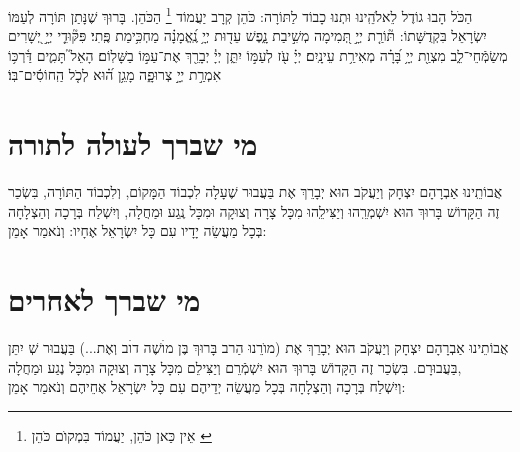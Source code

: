 \documentclass[a4paper, twoside, openany, parskip=half, 12pt]{article}
\begin{document}
 הַכֹּל הָבוּ גוֹדֶל לֵאלֹהֵֽינוּ וּתְנוּ כָבוֹד לַתּוֹרָה: כֹּהֵן קְרָב יַעֲמוֹד 
  \footnote{
  אֵין כַּאן כֹּהֵן, יַעֲמוֹד 
  בִּמְקוׂם כֹּהֵן
  \label{xx}} 
 הַכֹּהֵן. בָּרוּךְ שֶׁנָּתַן תּוֹרָה לְעַמּוֹ יִשְׂרָאֵל בִּקְדֻשָּׁתוֹ:
תּ֘וֹרַ֤ת יְיָ֣ תְּ֭מִימָה מְשִׁ֣יבַת נָ֑פֶשׁ עֵד֖וּת יְיָ֥ נֶֽ֝אֱמָנָ֗ה מַחְכִּ֥ימַת פֶּֽתִי׃ פִּקּ֘וּדֵ֤י יְיָ֣ יְ֭שָׁרִים מְשַׂמְּֿחֵי־לֵ֑ב מִצְוַ֖ת יְיָ֥ בָּ֝רָ֗ה מְאִירַ֥ת עֵינָֽיִם׃
 יְיָ֗ עֹ֖ז לְעַמּ֣וֹ יִתֵּ֑ן יְיָ֓ יְבָרֵ֖ךְ אֶת־עַמּ֣וֹ בַשָּׁלֽוֹם׃  הָאֵל֮ תָּמִ֢ים דַּ֫רְכּ֥וֹ אִמְרַ֣ת יְיָ֣ צְרוּפָ֑ה מָגֵ֥ן ה֝֗וּא לְכֹ֤ל הַֽחוֹסִ֬ים־בּֽוֹ׃

\section*{מי שברך לעולה לתורה}
 אֲבוֹתֵֽינוּ אַבְרָהָם יִצְחָק וְיַעֲקֹב הוּא יְבָרֵךְ אֶת 
  בַּעֲבוּר שֶׁעָלָה לִכְבוֹד הַמָּקוֹם,  וְלִכְבוֹד הַתּוֹרָה, 
 בִּשְׂכַר זֶה הַקָּדוֹשׁ בָּרוּךְ הוּא יִשְׁמְרֵֽהוּ וְיַצִּילֵֽהוּ מִכָּל צָרָה וְצוּקָה
וּמִכָּל נֶֽגַע וּמַחֲלָה,
  וְיִשְׁלַח בְּרָכָה וְהַצְלָחָה בְּכָל מַעֲשֵׂה יָדָיו 
    עִם כָּל יִשְׂרָאֵל אֶחָיו: וְנֹאמַר אָמֵן:\\

\section*{מי שברך לאחרים}
 אֲבוֹתֵינוּ אַבְרָהָם יִצְחָק וְיַעֲקֹב הוּא יְבָרֵךְ אֶת (מוׂרֵנוּ הַרב בָּרוּךְ בֶּן מוׄשֶׁה דוׄב וְאֶת...) בַּעֲבוּר  שְׁ
  יִתֵּן 
   בַּעֲבוּרָם. בִּשְׂכַר זֶה הַקָּדוֹשׁ בָּרוּךְ הוּא יִשְׁמְֿרֵם וְיַצִּילֵם מִכָּל צָרָה וְצוּקָה וּמִכָּל נֶגַע וּמַחֲלָה,\\
  וְיִשְׁלַח בְּרָכָה וְהַצְלָחָה בְּכָל מַעֲשֵׂה יְדֵיהֶם עִם כָּל יִשְׂרָאֵל אֶחֵיהֶם וְנֹאמַר אָמֵן:\\
\end{document}
